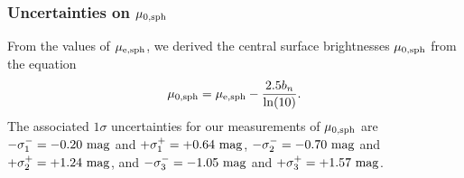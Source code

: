\documentclass[preprint2]{emulateapj}
\begin{document}
\subsubsection{Uncertainties on $\mu_{\rm 0,sph}$}
From the values of $\mu_{\rm e,sph}$, we derived the central surface brightnesses $\mu_{\rm 0,sph}$ from the equation
\begin{equation}
\mu_{\rm 0,sph} = \mu_{\rm e,sph} - \frac{2.5 b_n}{\ln(10)}.
\end{equation}
The associated $1\sigma$ uncertainties for our measurements of $\mu_{\rm 0,sph}$ are 
$-\sigma_1^- = -0.20~\rm mag$ and $+\sigma_1^+ = +0.64~\rm mag$, 
$-\sigma_2^- = -0.70~\rm mag$ and $+\sigma_2^+ = +1.24~\rm mag$,
and $-\sigma_3^- = -1.05~\rm mag$ and $+\sigma_3^+ = +1.57~\rm mag$. 
\end{document}
